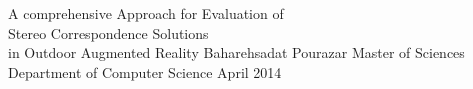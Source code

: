 \documentclass[dvips,letterpaper,12pt]{report}
\begin{document}

\thesistitle
	{A comprehensive Approach for Evaluation of \\ 
	Stereo Correspondence Solutions \\
	in Outdoor Augmented Reality}
	{Baharehsadat Pourazar}
	{Master of Sciences}
	{Department of Computer Science}
	{April 2014}


%












 
\end{document}
